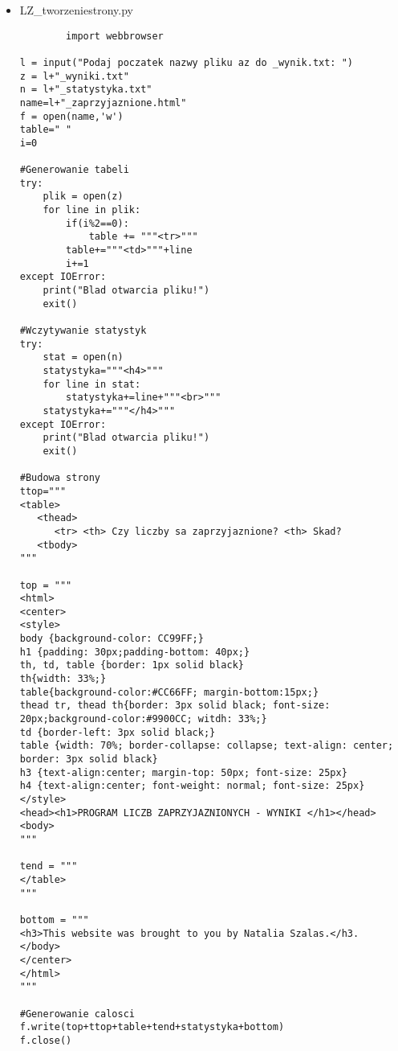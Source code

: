 \documentclass[12pt,a4paper]{article}
\begin{document}
\begin{itemize}
\begin{lstlisting}
l = input("Podaj nazwe pliku bez jego rozszerzenia: ")
test = LoadFile(l+".txt")
for x in range(0,len(test)):
    luv = test[x].split(" ")
    c = int(luv[0])
    d = int(luv[1])
    kap=areFriends(c,d)
    SaveFile(kap, l)
statistics(l)





	\end{lstlisting}
	
	\item LZ\_tworzeniestrony.py
	\begin{lstlisting}
	    import webbrowser

l = input("Podaj poczatek nazwy pliku az do _wynik.txt: ")
z = l+"_wyniki.txt"
n = l+"_statystyka.txt"
name=l+"_zaprzyjaznione.html"
f = open(name,'w')
table=" "
i=0

#Generowanie tabeli
try:
    plik = open(z)
    for line in plik:
        if(i%2==0):
            table += """<tr>"""
        table+="""<td>"""+line
        i+=1
except IOError:
    print("Blad otwarcia pliku!")
    exit()

#Wczytywanie statystyk
try:
    stat = open(n)
    statystyka="""<h4>"""
    for line in stat:
        statystyka+=line+"""<br>"""
    statystyka+="""</h4>"""
except IOError:
    print("Blad otwarcia pliku!")
    exit()

#Budowa strony
ttop="""
<table>
   <thead>
      <tr> <th> Czy liczby sa zaprzyjaznione? <th> Skad? 
   <tbody>
"""

top = """
<html>
<center>
<style>
body {background-color: CC99FF;}
h1 {padding: 30px;padding-bottom: 40px;}
th, td, table {border: 1px solid black}
th{width: 33%;}
table{background-color:#CC66FF; margin-bottom:15px;}
thead tr, thead th{border: 3px solid black; font-size: 20px;background-color:#9900CC; witdh: 33%;}
td {border-left: 3px solid black;}
table {width: 70%; border-collapse: collapse; text-align: center; border: 3px solid black}
h3 {text-align:center; margin-top: 50px; font-size: 25px}
h4 {text-align:center; font-weight: normal; font-size: 25px}
</style>
<head><h1>PROGRAM LICZB ZAPRZYJAZNIONYCH - WYNIKI </h1></head>
<body>
"""

tend = """
</table>
"""

bottom = """
<h3>This website was brought to you by Natalia Szalas.</h3.	
</body>
</center>
</html>
"""

#Generowanie calosci
f.write(top+ttop+table+tend+statystyka+bottom)
f.close()
	\end{lstlisting}
	\end{itemize}

   
\end{document}
